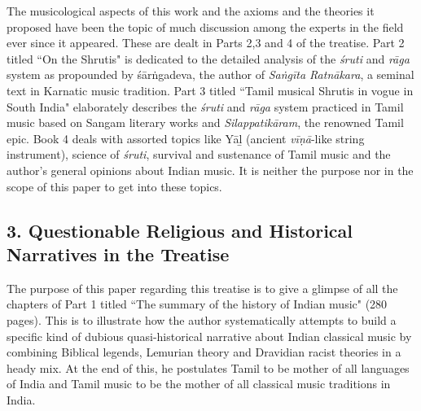 The musicological aspects of this work and the axioms and the theories it proposed have been the topic of much discussion among the experts in the field ever since it appeared. These are dealt in Parts 2,3 and 4 of the treatise. Part 2 titled ``On the Shrutis" is dedicated to the detailed analysis of the \textit{śruti} and \textit{rāga} system as propounded by śārṅgadeva, the author of \textit{Saṅgīta Ratnākara}, a seminal text in Karnatic music tradition. Part 3 titled ``Tamil musical Shrutis in vogue in South India" elaborately describes the \textit{śruti} and \textit{rāga} system practiced in Tamil music based on Sangam literary works and \textit{Silappatikāram}, the renowned Tamil epic. Book 4 deals with assorted topics like Yāḻ (ancient \textit{vīṇā}-like string instrument), science of \textit{śruti}, survival and sustenance of Tamil music and the author's general opinions about Indian music. It is neither the purpose nor in the scope of this paper to get into these topics.

\vspace{-.3cm}

\subsection*{3. Questionable Religious and Historical Narratives in the Treatise}

\vspace{-.3cm}

The purpose of this paper regarding this treatise is to give a glimpse of all the chapters of Part 1 titled ``The summary of the history of Indian music" (280 pages). This is to illustrate how the author systematically attempts to build a specific kind of dubious quasi-historical narrative about Indian classical music by combining Biblical legends, Lemurian theory and Dravidian racist theories in a heady mix. At the end of this, he postulates Tamil to be mother of all languages of India and Tamil music to be the mother of all classical music traditions in India.


